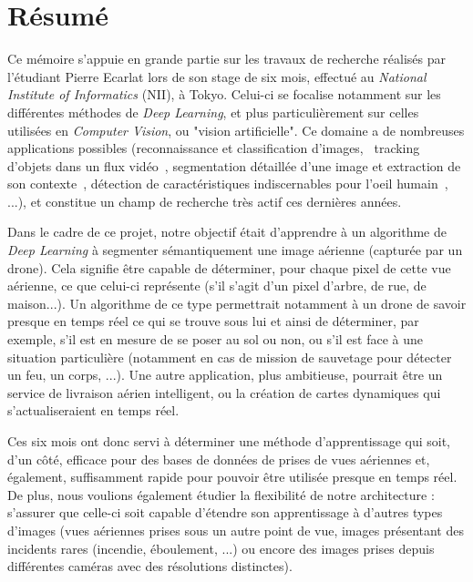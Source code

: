 \section*{Résumé}

Ce mémoire s'appuie en grande partie sur les travaux de recherche réalisés par l'étudiant Pierre Ecarlat lors de son stage de six mois, effectué au \textit{National Institute of Informatics} (NII), à Tokyo. Celui-ci se focalise notamment sur les différentes méthodes de \textit{Deep Learning}, et plus particulièrement sur celles utilisées en \textit{Computer Vision}, ou "vision artificielle". Ce domaine a de nombreuses applications possibles (reconnaissance et classification d'images,~\cite{RUSS15, LECU98} tracking d'objets dans un flux vidéo~\cite{WANG13, ROSS08}, segmentation détaillée d'une image et extraction de son contexte~\cite{LONG15, BADR15}, détection de caractéristiques indiscernables pour l'oeil humain~\cite{SILV16, MNIH13}, ...), et constitue un champ de recherche très actif ces dernières années.

Dans le cadre de ce projet, notre objectif était d'apprendre à un algorithme de \textit{Deep Learning} à segmenter sémantiquement une image aérienne (capturée par un drone). Cela signifie être capable de déterminer, pour chaque pixel de cette vue aérienne, ce que celui-ci représente (s'il s'agit d'un pixel d'arbre, de rue, de maison...). Un algorithme de ce type permettrait notamment à un drone de savoir presque en temps réel ce qui se trouve sous lui et ainsi de déterminer, par exemple, s'il est en mesure de se poser au sol ou non, ou s'il est face à une situation particulière (notamment en cas de mission de sauvetage pour détecter un feu, un corps, ...). Une autre application, plus ambitieuse, pourrait être un service de livraison aérien intelligent, ou la création de cartes dynamiques qui s'actualiseraient en temps réel.

Ces six mois ont donc servi à déterminer une méthode d'apprentissage qui soit, d'un côté, efficace pour des bases de données de prises de vues aériennes et, également, suffisamment rapide pour pouvoir être utilisée presque en temps réel. De plus, nous voulions également étudier la flexibilité de notre architecture : s'assurer que celle-ci soit capable d'étendre son apprentissage à d'autres types d'images (vues aériennes prises sous un autre point de vue, images présentant des incidents rares (incendie, éboulement, ...) ou encore des images prises depuis différentes caméras avec des résolutions distinctes).

